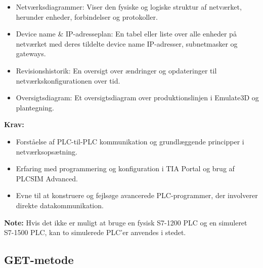 \begin{enumerate}
\begin{itemize}
		\item Netværksdiagrammer: Viser den fysiske og logiske struktur af netværket, herunder enheder, forbindelser og protokoller.
		\item Device name \& IP-adresseplan: En tabel eller liste over alle enheder på netværket med deres tildelte device name IP-adresser, subnetmasker og gateways.
		\item Revisionshistorik: En oversigt over ændringer og opdateringer til netværkskonfigurationen over tid.
		\item Oversigtsdiagram: Et oversigtsdiagram over produktionslinjen i Emulate3D og plantegning.
	\end{itemize}
\end{enumerate}

\textbf{Krav:}
\begin{itemize}
	\item Forståelse af PLC-til-PLC kommunikation og grundlæggende principper i netværksopsætning.
	\item Erfaring med programmering og konfiguration i TIA Portal og brug af PLCSIM Advanced.
	\item Evne til at konstruere og fejlsøge avancerede PLC-programmer, der involverer direkte datakommunikation.
\end{itemize}
\textbf{Note:} Hvis det ikke er muligt at bruge en fysisk S7-1200 PLC og en simuleret S7-1500 PLC, kan to simulerede PLC'er anvendes i stedet.

\subsection*{GET-metode}
\label{subsec:get_method_plc_communication}

